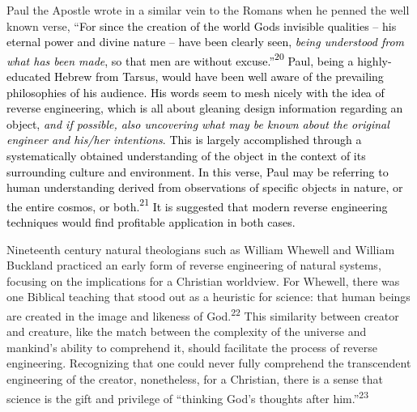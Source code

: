 Paul the Apostle wrote in a similar vein to the Romans when he penned
the well known verse, “\textcolor{black}{For since the creation of the
world God{\textquotesingle}s invisible qualities – his eternal power
and divine nature – have been clearly seen,
}\textit{\textcolor{black}{being understood from what has been
made}}\textcolor{black}{, so that men are without
excuse.”}\textcolor{black}{\textsuperscript{20}}\textcolor{black}{
Paul, being a highly-educated Hebrew from Tarsus, would have been well
aware of the prevailing philosophies of his audience. His words seem to
mesh nicely with the idea of reverse engineering, which is all about
gleaning design information regarding an object,
}\textit{\textcolor{black}{and if possible, also uncovering what may be
known about the original engineer and his/her
intentions}}\textcolor{black}{. This is largely accomplished through a
systematically obtained understanding of the object in the context of
its surrounding culture and environment. In this verse, Paul may be
referring to human understanding derived from observations of specific
objects in nature, or the entire cosmos, or
both.}\textcolor{black}{\textsuperscript{21}}\textcolor{black}{ It is
suggested that modern reverse engineering techniques would find
profitable application in both cases.}


Nineteenth century natural theologians such as William Whewell and
William Buckland practiced an early form of reverse engineering of
natural systems, focusing on the implications for a Christian
worldview. For Whewell, there was one Biblical teaching that stood out
as a heuristic for science: that human beings are created in the image
and likeness of God.\textsuperscript{22} This similarity between
creator and creature, like the match between the complexity of the
universe and mankind’s ability to comprehend it, should facilitate the
process of reverse engineering. Recognizing that one could never fully
comprehend the transcendent engineering of the creator, nonetheless,
for a Christian, there is a sense that science is the gift and
privilege of “thinking God’s thoughts after him.”\textsuperscript{23} 


